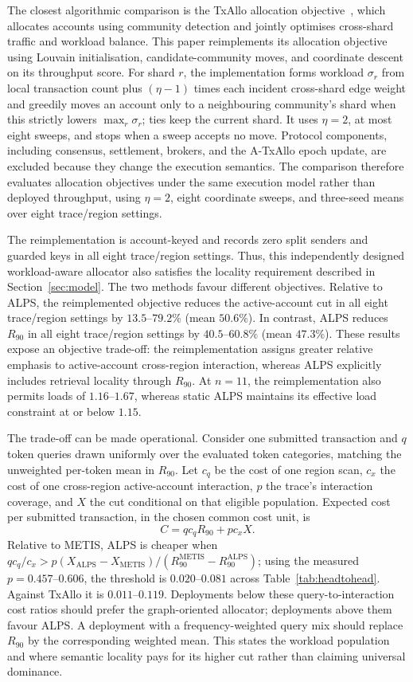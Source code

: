 \documentclass[runningheads]{llncs}
\begin{document}
The closest algorithmic comparison is the TxAllo allocation objective~\cite{txallo2023}, which allocates
accounts using community detection and jointly optimises cross-shard traffic and
workload balance. This paper reimplements its allocation objective using Louvain
initialisation, candidate-community moves, and coordinate descent on its
throughput score. For shard $r$, the implementation forms workload $\sigma_r$
from local transaction count plus $(\eta-1)$ times each incident cross-shard
edge weight and greedily moves an account only to a neighbouring community's
shard when this strictly lowers $\max_r\sigma_r$; ties keep the current shard.
It uses $\eta=2$, at most eight sweeps, and stops when a sweep accepts no move.
Protocol components, including consensus, settlement,
brokers, and the A-TxAllo epoch update, are excluded because they change the
execution semantics. The comparison therefore evaluates allocation objectives
under the same execution model rather than deployed throughput, using $\eta=2$,
eight coordinate sweeps, and three-seed means over eight trace/region settings.

The reimplementation is account-keyed and records zero split senders and guarded keys in all
eight trace/region settings. Thus, this independently designed workload-aware
allocator also satisfies the locality requirement described in
Section~\ref{sec:model}. The two methods favour different objectives. Relative
to ALPS, the reimplemented objective reduces the active-account cut in all eight trace/region
settings by $13.5$--$79.2\%$ (mean $50.6\%$). In contrast, ALPS reduces
$R_{90}$ in all eight trace/region settings by $40.5$--$60.8\%$
(mean $47.3\%$). These results expose an objective trade-off: the reimplementation assigns
greater relative emphasis to active-account cross-region interaction, whereas
ALPS explicitly includes retrieval locality through $R_{90}$. At $n=11$,
the reimplementation also permits loads of $1.16$--$1.67$, whereas static ALPS maintains its
effective load constraint at or below $1.15$.

The trade-off can be made operational. Consider one submitted transaction and
$q$ token queries drawn uniformly over the evaluated token categories, matching
the unweighted per-token mean in $R_{90}$. Let $c_q$ be the cost of one region
scan, $c_x$ the cost of one cross-region active-account interaction, $p$ the
trace's interaction coverage, and $X$ the cut conditional on that eligible
population. Expected cost per submitted transaction, in the chosen common cost
unit, is
\[
C=q c_q R_{90}+p c_x X.
\]
Relative to METIS, ALPS is cheaper when
$q c_q/c_x>p(X_{\mathrm{ALPS}}-X_{\mathrm{METIS}})/
(R_{90}^{\mathrm{METIS}}-R_{90}^{\mathrm{ALPS}})$; using the measured
$p=0.457$--$0.606$, the threshold is $0.020$--$0.081$ across
Table~\ref{tab:headtohead}. Against TxAllo it is $0.011$--$0.119$.
Deployments below these query-to-interaction cost ratios should prefer the
graph-oriented allocator; deployments above them favour ALPS. A deployment
with a frequency-weighted query mix should replace $R_{90}$ by the corresponding
weighted mean. This states the workload population and where semantic locality
pays for its higher cut rather than claiming universal dominance.
\end{document}
